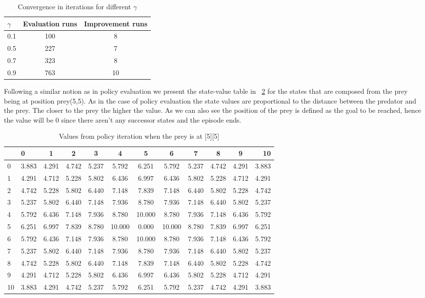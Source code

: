 \documentclass[paper=a4, fontsize=11pt]{scrartcl}
\numberwithin{equation}{section}		%
\numberwithin{figure}{section}			%
\numberwithin{table}{section}				%
\begin{document}
\begin{table}[H]
\caption{Convergence in iterations for different $\gamma$}
\centering
\begin{tabular}{|l||c|c|}
\hline
$\gamma$&Evaluation runs&Improvement runs\\
\hline
0.1&100&8\\
\hline
0.5&227&7\\
\hline
0.7&323&8\\
\hline
0.9&763&10\\
\hline
\end{tabular}
\label{convPIter}
\end{table}


Following a similar notion as in policy evaluation we present the state-value table in ~\ref{pitS} for the states that are composed from the prey being at position prey(5,5). As in the case of policy evaluation the state values are proportional to the distance between the predator and the prey. The closer to the prey the higher the value. As we can also see the position of the prey is defined as the goal to be reached, hence the value will be 0 since there aren't any successor states and the episode ends.

\begin{table}[H]
\caption{Values from policy iteration when the prey is at [5][5]}
\centering
\begin{tabular}{l|l*{9}{c}r}
  \hline
   & 0 & 1 & 2 & 3 & 4 & 5 & 6 & 7 & 8 & 9 & 10 \\ \hline 
0 & 3.883 & 4.291 & 4.742 & 5.237 & 5.792 & 6.251 & 5.792 & 5.237 & 4.742 & 4.291 & 3.883  \\
1 & 4.291 & 4.712 & 5.228 & 5.802 & 6.436 & 6.997 & 6.436 & 5.802 & 5.228 & 4.712 & 4.291  \\
2 & 4.742 & 5.228 & 5.802 & 6.440 & 7.148 & 7.839 & 7.148 & 6.440 & 5.802 & 5.228 & 4.742  \\
3 & 5.237 & 5.802 & 6.440 & 7.148 & 7.936 & 8.780 & 7.936 & 7.148 & 6.440 & 5.802 & 5.237  \\
4 & 5.792 & 6.436 & 7.148 & 7.936 & 8.780 & 10.000 & 8.780 & 7.936 & 7.148 & 6.436 & 5.792  \\
5 & 6.251 & 6.997 & 7.839 & 8.780 & 10.000 & 0.000 & 10.000 & 8.780 & 7.839 & 6.997 & 6.251  \\
6 & 5.792 & 6.436 & 7.148 & 7.936 & 8.780 & 10.000 & 8.780 & 7.936 & 7.148 & 6.436 & 5.792  \\
7 & 5.237 & 5.802 & 6.440 & 7.148 & 7.936 & 8.780 & 7.936 & 7.148 & 6.440 & 5.802 & 5.237  \\
8 & 4.742 & 5.228 & 5.802 & 6.440 & 7.148 & 7.839 & 7.148 & 6.440 & 5.802 & 5.228 & 4.742  \\
9 & 4.291 & 4.712 & 5.228 & 5.802 & 6.436 & 6.997 & 6.436 & 5.802 & 5.228 & 4.712 & 4.291  \\
10&3.883 & 4.291 & 4.742 & 5.237 & 5.792 & 6.251 & 5.792 & 5.237 & 4.742 & 4.291 & 3.883
\end{tabular}
\label{pitS}
\end{table}
\end{document}
